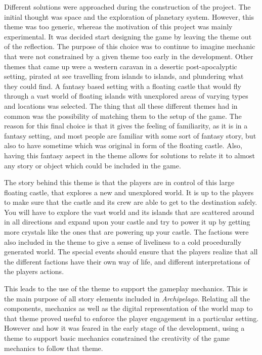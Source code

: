Different solutions were approached during the construction of the project. The initial thought was space and the exploration of planetary system. However, this theme was too generic, whereas the motivation of this project was mainly experimental. It was decided start designing the game by leaving the theme out of the reflection. The purpose of this choice was to continue to imagine mechanic that were not constrained by a given theme too early in the development. Other themes that came up were a western caravan in a desertic post-apocalyptic setting, pirated at see travelling from islands to islands, and plundering what they could find. A fantasy based setting with a floating castle that would fly through a vast world of floating islands with unexplored areas of varying types and locations was selected. The thing that all these different themes had in common was the possibility of matching them to the setup of the game. The reason for this final choice is that it gives the feeling of familiarity, as it is in a fantasy setting, and most people are familiar with some sort of fantasy story, but also to have sometime which was original in form of the floating castle. Also, having this fantasy aspect in the theme allows for solutions to relate it to almost any story or object which could be included in the game. 

The story behind this theme is that the players are in control of this large floating castle, that explores a new and unexplored world. It is up to the players to make sure that the castle and its crew are able to get to the destination safely. You will have to explore the vast world and its islands that are scattered around in all directions and expand upon your castle and try to power it up by getting more crystals like the ones that are powering up your castle.
The factions were also included in the theme to give a sense of liveliness to a cold procedurally generated world. The special events should ensure that the players realize that all the different factions have their own way of life, and different interpretations of the players actions. 

This leads to the use of the theme to support the gameplay mechanics. This is the main purpose of all story elements included in \textit{Archipelago}. Relating all the components, mechanics as well as the digital representation of the world map to that theme proved useful to enforce the player engagement in a particular setting. However and how it was feared in the early stage of the development, using a theme to support basic mechanics constrained the creativity of the game mechanics to follow that theme.



